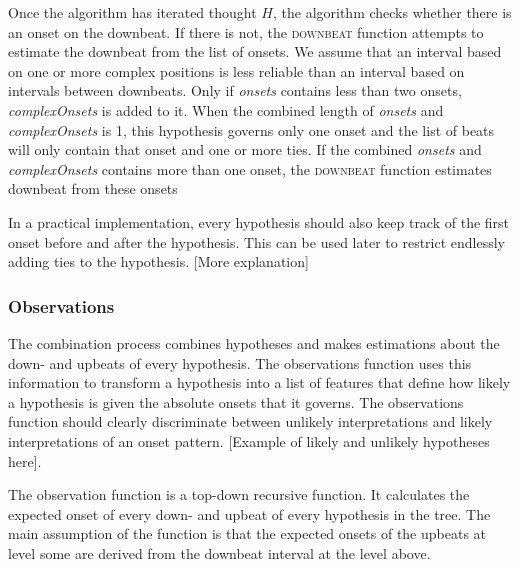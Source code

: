 Once the algorithm has iterated thought $H$, the algorithm checks whether there is an onset on the downbeat. If there is not, the \textsc{downbeat} function attempts to estimate the downbeat from the list of onsets. We assume that an interval based on one or more complex positions is less reliable than an interval based on intervals between downbeats. Only if \textit{onsets} contains less than two onsets, \textit{complexOnsets} is added to it. When the combined length of \textit{onsets} and \textit{complexOnsets} is 1, this hypothesis governs only one onset and the list of beats will only contain that onset and one or more ties. If the combined \textit{onsets} and \textit{complexOnsets} contains more than one onset, the \textsc{downbeat} function estimates downbeat from these onsets

In a practical implementation, every hypothesis should also keep track of the first onset before and after the hypothesis. This can be used later to restrict endlessly adding ties to the hypothesis. [More explanation]

\subsubsection{Observations}

The combination process combines hypotheses and makes estimations about the down- and upbeats of every hypothesis. The observations function uses this information to transform a hypothesis into a list of features that define how likely a hypothesis is given the absolute onsets that it governs. The observations function should clearly discriminate between unlikely interpretations and likely interpretations of an onset pattern. [Example of likely and unlikely hypotheses here].

The observation function is a top-down recursive function. It calculates the expected onset of every down- and upbeat of every hypothesis in the tree. The main assumption of the function is that the expected onsets of the upbeats at level some are derived from the downbeat interval at the level above. 


